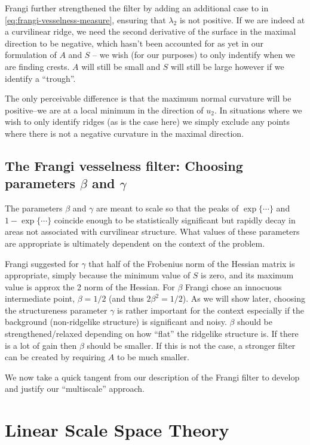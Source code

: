  Frangi further strengthened the filter by adding an additional case to in \cref{eq:frangi-vesselness-measure}, ensuring that $\lambda_2$ is not positive. If we are indeed at a curvilinear ridge, we need the second derivative of the surface in the maximal direction to be negative, which hasn't been accounted for as yet in our formulation of $A$ and $S$ -- we wish (for our purposes) to only indentify when we are finding crests. $A$ will still be small and $S$ will still be large however if we identify a ``trough''.
 
 The only perceivable difference is that the maximum normal curvature will be positive--we are at a local minimum in the direction of $u_2$. In situations where we wish to only identify ridges (as is the case here) we simply exclude any points where there is not a negative curvature in the maximal direction. 
    
    \subsection{The Frangi vesselness filter: Choosing parameters $\beta$ and $\gamma$}
    
    The parameters $\beta$ and $\gamma$ are meant to scale so that the peaks of $\exp\{\cdots\}$ and $1-\exp\{\cdots\}$ coincide enough to be statistically significant but rapidly decay in areas not associated with curvilinear structure. What values of these parameters are appropriate is ultimately dependent on the context of the problem.
    
    Frangi suggested for $\gamma$ that half of the Frobenius norm of the Hessian matrix is appropriate, simply because the minimum value of $S$ is zero, and  its maximum value is approx the 2 norm of the Hessian.
    For $\beta$ Frangi chose an innocuous intermediate point, $\beta=1/2$ (and thus $2\beta^2 = 1/2$).
    As we will show later, choosing the structureness parameter $\gamma$ is rather important for the context especially if the background (non-ridgelike structure) is significant and noisy. $\beta$ should be strengthened/relaxed depending on how ``flat'' the ridgelike structure is. If there is a lot of gain then $\beta$ should be smaller. If this is not the case, a stronger filter can be created by requiring $A$ to be much smaller.

	We now take a quick tangent from our description of the Frangi filter to develop and justify our ``multiscale'' approach.
	
        
    \section{Linear Scale Space Theory} \label{sec:scale-space-theory}
    

